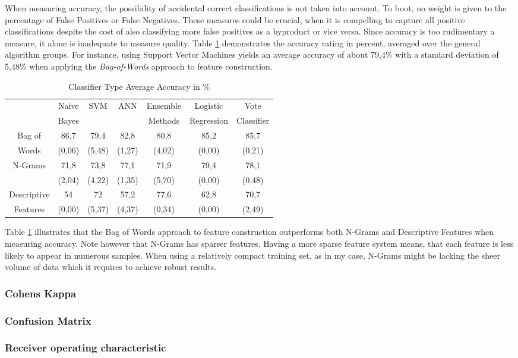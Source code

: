 			\par
			When measuring accuracy, the possibility of accidental correct classifications is not taken into account. To boot, no weight is given to the percentage of False Positives or False Negatives. These measures could be crucial, when it is compelling to capture all positive classifications despite the cost of also classifying more false positives as a byproduct or vice versa. Since accuracy is too rudimentary a measure, it alone is inadequate to measure quality. Table \ref{tab:accuracy} demonstrates the accuracy rating in percent, averaged over the general algorithm groups. For instance, using Support Vector Machines yields an average accuracy of about 79,4\% with a standard deviation of 5,48\% when applying the \textit{Bag-of-Words} approach to feature construction.
			
			\par
			
			\begin{table}[H]
				\centering
				\begin{tabular}{c|cccccc}
					\hline\hline\vspace*{-2mm}
											 & Naive & \multirow{2}{*}{SVM} & \multirow{2}{*}{ANN} & Ensemble & Logistic 	 & Vote \\
											 & Bayes & 					 	&       			   & Methods  & Regression 	 & Classifier \\
					\hline
					Bag of					 & 86,7   & 79,4   & 82,8   & 80,8 	 & 85,2   & 85,7  \\
					Words					 & (0,06) & (5,48) & (1,27) & (4,02) & (0,00) & (0,21) \\
					\hline
					\multirow{2}{*}{N-Grams} & 71,8   & 73,8   & 77,1 	& 71,9 	 & 79,4   & 78,1 \\
											 & (2,04) & (4,22) & (1,35) & (5,70) & (0,00) & (0,48)\\	
					\hline
					Descriptive				 & 54 	  & 72 	   & 57,2   & 77,6   & 62,8   &  70,7\\
					Features 				 & (0,00) & (5,37) & (4,37) & (0,34) & (0,00) & (2,49)\\	
					\hline\hline				
				\end{tabular}
				\caption{Classifier Type Average Accuracy in \%}
				\label{tab:accuracy}%
			\end{table}%
		
		Table \ref{tab:accuracy} illustrates that the Bag of Words approach to feature construction outperforms both N-Grams and Descriptive Features when measuring accuracy. Note however that N-Grams has sparser features. Having a more sparse feature system means, that each feature is less likely to appear in numerous samples. When using a relatively compact training set, as in my case, N-Grams might be lacking the sheer volume of data which it requires to achieve robust results.
		
		\subsubsection{Cohens Kappa}
		
		\subsubsection{Confusion Matrix}
		
		\subsubsection{Receiver operating characteristic}
